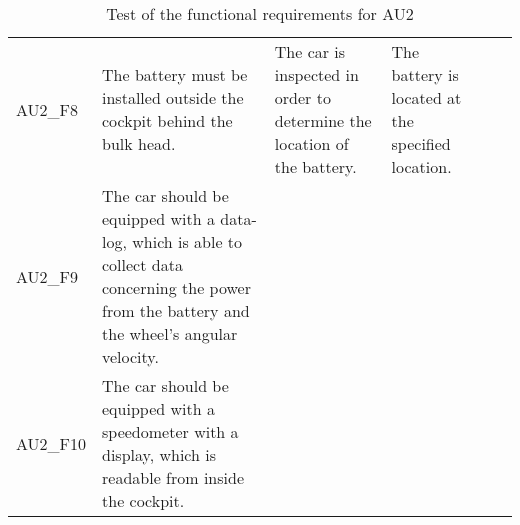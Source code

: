 \begin{table}[h!]
\begin{tabular}{|p{1.6 cm}|p{2.9 cm}|p{2.1 cm}|p{2.1 cm}|p{2.1 cm}|p{1.9 cm}|}
		& 
		& 
		& 
		& \\ \hline
		AU2\_F8 
		& The battery must be installed outside the cockpit behind the bulk head.
		& The car is inspected in order to determine the location of the battery.
		& The battery is located at the specified location.
		& 
		& \\ \hline
		AU2\_F9 
		& The car should be equipped with a data-log, which is able to collect data concerning the power from the battery and the wheel's angular velocity.
		& 
		& 
		& 
		& \\ \hline
		AU2\_F10 
		& The car should be equipped with a speedometer with a display, which is readable from inside the cockpit.
		& 
		& 
		& 
		& \\ \hline				
	\end{tabular}
	\caption{Test of the functional requirements for AU2}
\end{table}